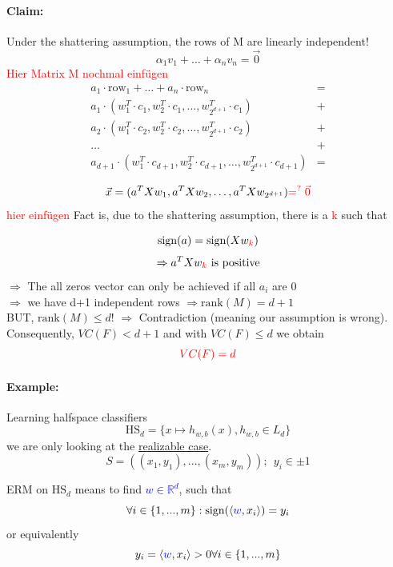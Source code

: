 \documentclass[10pt,a4paper]{article}
\theoremstyle{definition}
\theoremstyle{plain}
\begin{document}
 \paragraph{Claim:} Under the shattering assumption, the rows of M are linearly independent!
 $$ \alpha_1 v_1 + \hdots + \alpha_n v_n = \vec{0}$$
 \newline
 \textcolor{red}{ Hier Matrix M nochmal einfügen}
 \newline
\begin{align*}
a_1 \cdot \text{row}_1 + \hdots + a_n \cdot \text{row}_n &=\\
a_1 \cdot ( w_1^T \cdot c_1, w_2^T\cdot c_1, \hdots, w_{2^{d+1}}^T\cdot c_1 ) &+\\
a_2 \cdot ( w_1^T\cdot c_2, w_2^T\cdot c_2, \hdots, w_{2^{d+1}}^T\cdot c_2 ) &+\\
\hdots &+\\
a_{d+1} \cdot ( w_1^T \cdot c_{d+1}, w_2^T\cdot c_{d+1}, \hdots, w_{2^{d+1}}^T\cdot c_{d+1} ) &=
\end{align*}

\begin{align*}
	\vec{x} = (a^T X w_1, a^T X w_2, \hdots, a^T X w_{2^{d+1}}) \textcolor{red}{=^? \vec{0}}
\end{align*}
\textcolor{red}{hier einfügen}
\newline
Fact is, due to the shattering assumption, there is a \textcolor{red}{k} such that

$$
	\text{sign}(a) = \text{sign}(Xw_{\textcolor{red}{k}})
$$
$$
\Rightarrow a^T X w_{\textcolor{red}{k}} \text{ is positive}
$$
$\Rightarrow$ The all zeros vector can only be achieved if all $a_i$ are 0\\
$\Rightarrow$ we have d+1 independent rows $\Rightarrow \text{rank}(M) = d+1$\\
BUT, $\text{rank}(M) \leq d$! $\Rightarrow$ Contradiction (meaning our assumption is wrong). Consequently, $VC(F) < d+1$ and with $VC(F) \leq d$ we obtain $$\textcolor{red}{VC(F) = d}$$


\paragraph{Example:} Learning halfspace classifiers\\
$$\text{HS}_d = \{ x \mapsto h_{w,b}(x), h_{w,b} \in L_d \}$$
we are only looking at the \underline{realizable case}.
$$S = ((x_1, y_1), ..., (x_m, y_m));\  \ y_i \in {\pm 1}$$

ERM on $\text{HS}_d$ means to find \textcolor{blue}{$w \in \mathbb{R}^{d}$}, such that 
$$
\forall i \in \{ 1, ..., m \}: \text{sign}(\langle \textcolor{blue}{w}, x_i\rangle) = y_i
$$
or equivalently 
$$
y_i =  \langle \textcolor{blue}{w}, x_i\rangle > 0 \forall i \in \{ 1, ..., m \}
$$
\end{document}
